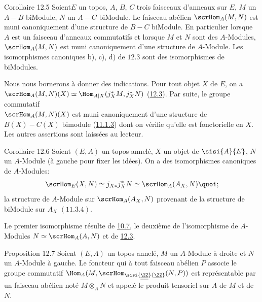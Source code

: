 \documentclass[10pt]{../fichiers-configuration-latex/smfart}
\begin{document}
\begin{enonce*}{Corollaire 12.5}
Soient\pageoriginale $E$ un topos, $A$, $B$, $C$ trois faisceaux
d'anneaux sur $E$, $M$ un $A-B$ biModule, $N$ un $A-C$ biModule. Le
faisceau abélien $\scrHom_A(M,N)$ est muni canoniquement d'une
structure de $B-C$ biModule. En particulier lorsque $A$ est un
faisceau d'anneaux commutatifs et lorsque $M$ et $N$ sont des
$A$-Modules, $\scrHom_A(M,N)$ est muni canoniquement d'une structure
de $A$-Module. Les isomorphismes canoniques {\rm b), c), d)} de
$\hyperref[IV.prop12.3]{12.3}$ sont des isomorphismes de biModules.
\end{enonce*}

Nous nous bornerons à donner des indications. Pour tout objet $X$ de
$E$, on a $\scrHom_A(M,N)(X)\simeq \Hom_{A| X}(j^{\ast}_XM,
j^{\ast}_XN)$ (\hyperref[IV.prop12.3]{12.3}). Par suite, le groupe commutatif\\
$\scrHom_A(M,N)(X)$ est muni canoniquement d'une structure de
$B(X)-C(X)$ bimodule (\hyperref[IV.subsubsec11.1.3]{11.1.3}) dont on vérifie
qu'elle est fonctorielle en $X$. Les autres assertions sont laissées
au lecteur.

\begin{enonce*}{Corollaire 12.6}
Soient $(E,A)$ un topos annelé, $X$ un objet de $\sisi{A}{E}$, $N$ un
$A$-Module (à gauche pour fixer les idées). On a des isomorphismes
canoniques de $A$-Modules:
$$
\scrHom_E(X,N)\simeq j_{X\ast}j^{\ast}_XN\simeq \scrHom_A(A_X,
N){\quoi};
$$
la structure de $A$-Module sur $\scrHom_A(A_X,N)$ provenant de la
structure de biModule sur $A_X$ $(\hyperref[IV.rem11.3.4]{11.3.4})$.
\end{enonce*}

Le premier isomorphisme résulte de \hyperref[IV.cor10.7]{10.7}, le deuxième de
l'isomorphisme de $A$-Modules $N\simeq \scrHom_A(A,N)$ et de
\hyperref[IV.prop12.3]{12.3}.

\begin{enonce*}{Proposition 12.7}
Soient $(E,A)$ un topos annelé, $M$ un $A$-Module à droite et $N$ un
$A$-Module à gauche. Le foncteur qui à tout faisceau abélien $P$
associe le groupe commutatif
$\Hom_A(M,\scrHom_{\sisi{\underline{\underline{\ZZ}}}{\underline{\ZZ}}}(N,P))$ est représentable par
un faisceau abélien noté $M\otimes_A N$ et appelé le produit
tensoriel sur $A$ de $M$ et de $N$.
\end{enonce*}
\end{document}

